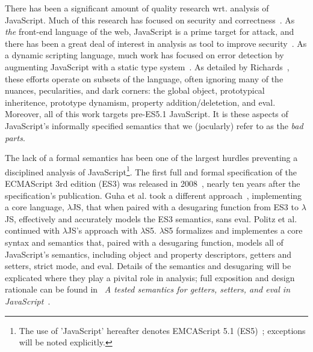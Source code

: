 \documentclass[preprint,9pt]{sigplanconf} %
\begin{document}
There has been a significant amount of quality research wrt. analysis
of JavaScript. Much of this research has focused on security and
correctness~\cite{Richards:dynamism}. As \emph{the} front-end language
of the web, JavaScript is a prime target for attack, and there has
been a great deal of interest in analysis as tool to improve
security~\cite{chugh2009staged, Guha:2009:USA:1526709.1526785,
  maffeis2009isolating, vogt2007cross,
  Yu:2007:JIB:1190216.1190252}. As a dynamic scripting language, much
work has focused on error detection by augmenting JavaScript with a
static type system~\cite{anderson2006type, anderson2003babyj,
  anderson2005type, heidegger2009recency, heidegger2009recency,
  hackett2012fast}.  As detailed
by Richards~\cite{Richards:dynamism}, these efforts operate on subsets
of the language, often ignoring many of the nuances, pecularities, and
dark corners: the global object, prototypical inheritence, prototype
dynamism, property addition/deletetion, and eval.  Moreover, all of
this work targets pre-ES5.1 JavaScript. It is these aspects of
JavaScript's informally specified semantics that we (jocularly) refer
to as the \emph{bad parts}.

The lack of a formal semantics has been one of the largest hurdles
preventing a disciplined analysis of JavaScript\footnote{The use of
  'JavaScript' hereafter denotes EMCAScript 5.1
  (ES5)~\cite{ecma2009ecma}; exceptions will be noted
  explicitly.}. The first full and formal specification of the
ECMAScript 3rd edition (ES3) was released in
2008~\cite{Ramalingam:PLS}, nearly ten years after the specification's
publication. Guha et al. took a different
approach~\cite{Guha:2010:EJ:1883978.1883988}, implementing a core
language, $\lambda$JS, that when paired with a desugaring function
from ES3 to $\lambda$JS, effectively and accurately models the ES3
semantics, sans eval. Politz et
al.~\cite{Politz:2012:TSG:2480360.2384579} continued with
$\lambda$JS's approach with $\lambda$S5. $\lambda$S5 formalizes and
implementes a core syntax and semantics that, paired with a desugaring
function, models all of JavaScript's semantics, including object and
property descriptors, getters and setters, strict mode, and
eval. Details of the semantics and desugaring will be explicated where
they play a pivital role in analysis; full exposition and design
rationale can be found in ~\emph{A tested semantics for getters,
  setters, and eval in
  JavaScript}~\cite{Politz:2012:TSG:2480360.2384579}.
\end{document}
